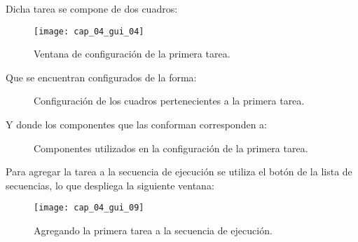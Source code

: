 \documentclass[\main/Main.tex]{subfiles}
\begin{document}
                \newpage
                \vspace{-6mm}
                Dicha tarea se compone de dos cuadros: 
                \begin{figure}[H]
                    \centering
                    \texttt{[image: cap\_04\_gui\_04]}
                    \caption{Ventana de configuración de la primera tarea.}
                    \label{fig:04_gui_exp03}
                \end{figure} 

                \vspace{-6mm}
                Que se encuentran configurados de la forma:
                \begin{figure}[H]
                    \centering
                     \hspace{5mm}
                    \caption{Configuración de los cuadros pertenecientes a la primera tarea.}
                    \label{fig:04_gui_exp04}
                \end{figure} 

                \newpage
                \vspace{-6mm}
                Y donde los componentes que las conforman corresponden a: 
                \begin{figure}[H]
                    \centering
                     \hspace{5mm}
                    \caption{Componentes utilizados en la configuración de la primera tarea.}
                    \label{fig:04_gui_exp05}
                \end{figure} 

                \vspace{-6mm}
                Para agregar la tarea a la secuencia de ejecución se utiliza el botón  de la lista de secuencias, lo que despliega la siguiente ventana: 
                \begin{figure}[H]
                    \centering
                    \texttt{[image: cap\_04\_gui\_09]}
                    \caption{Agregando la primera tarea a la secuencia de ejecución.}
                    \label{fig:04_gui_exp06}
                \end{figure} 
\end{document}
